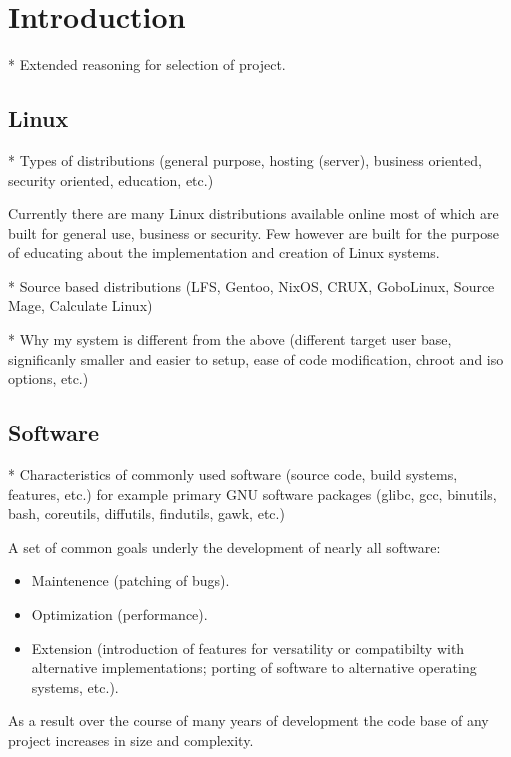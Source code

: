 \section{Introduction}\label{Introduction}

* Extended reasoning for selection of project.

\subsection{Linux}

* Types of distributions (general purpose, hosting (server), business oriented, security oriented, education, etc.)

Currently there are many Linux distributions available online most of which are built for general use, business or security. Few however are built for the purpose of educating about the implementation and creation of Linux systems. 

* Source based distributions (LFS, Gentoo, NixOS, CRUX, GoboLinux, Source Mage, Calculate Linux)

* Why my system is different from the above (different target user base, significanly smaller and easier to setup, ease of code modification, chroot and iso options, etc.)


\subsection{Software}

* Characteristics of commonly used software (source code, build systems, features, etc.) for example primary GNU software packages (glibc, gcc, binutils, bash, coreutils, diffutils, findutils, gawk, etc.)

A set of common goals underly the development of nearly all software:

\begin{itemize}
    \item Maintenence (patching of bugs).
    \item Optimization (performance).
    \item Extension (introduction of features for versatility or compatibilty with alternative implementations; porting of software to alternative operating systems, etc.).
\end{itemize}

As a result over the course of many years of development the code base of any project increases in size and complexity.

